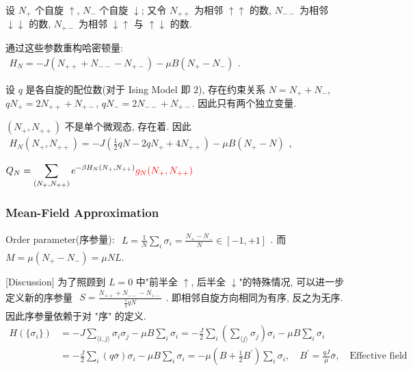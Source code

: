 \documentclass[../../main.tex]{subfiles}
\begin{document}
设 $N_{+}$ 个自旋 $\uparrow$, $N_{-}$ 个自旋 $\downarrow$; 又令 $N_{++}$ 为相邻 $\uparrow\uparrow$ 的数, $N_{--}$ 为相邻 $\downarrow\downarrow$ 的数, $N_{+-}$ 为相邻 $\downarrow\uparrow$ 与 $\uparrow\downarrow$ 的数. 

通过这些参数重构哈密顿量: $\begin{aligned}
    H_{N} = -J(N_{++}+N_{--}-N_{+-}) - \mu B(N_{+}-N_{-})
\end{aligned}$. 

设 $q$ 是各自旋的配位数(对于 Ising Model 即 $2$), 存在约束关系 $N = N_{+} + N_{-}$,  $qN_{+} = 2N_{++} + N_{+-}$,  $qN_{-} = 2N_{--} + N_{+-}$. 因此只有两个独立变量. 

$(N_{+},N_{++})$ 不是单个微观态, 存在着{\color{red}{简并}}. 因此$\begin{aligned}
    H_{N}(N_{+},N_{++}) = -J\left(\frac{1}{2}qN - 2qN_{+} + 4N_{++}\right) - \mu B(N_{+}-N)\end{aligned}$, 
    
$\begin{aligned}
        Q_{N} = \sum_{(N_{+},N_{++})} e^{-\beta H_{N}(N_{+},N_{++})}{\color{red}{g_{N}(N_{+},N_{++})}}
    \end{aligned}$ 

\subsubsection{Mean-Field Approximation}

Order parameter(序参量): $\begin{aligned}
    L = \frac{1}{N}\sum_{i}\sigma_{i} = \frac{N_{+}-N_{-}}{N}\in[-1,+1]
\end{aligned}$. 而 $M = \mu(N_{+}-N_{-}) = \mu NL$.

[Discussion] 为了照顾到 $L = 0$ 中"前半全 $\uparrow$, 后半全 $\downarrow$"的特殊情况, 可以进一步定义新的序参量 $\begin{aligned}
    S = \frac{N_{++}+N_{--}-N_{+-}}{\frac{1}{2}qN}
\end{aligned}$. 即相邻自旋方向相同为有序, 反之为无序. 因此序参量依赖于对 "序" 的定义.
\begin{align*}
    H(\{\sigma_{i}\}) 
    &= -J\sum_{\langle i,j\rangle}\sigma_{i}\sigma_{j} -\mu B\sum_{i}\sigma_{i} 
    = -\frac{J}{2}\sum_{i}\left(\sum_{\langle j\rangle}\sigma_{j}\right)\sigma_{i} - \mu B\sum_{i}\sigma_{i}\\
    &= -\frac{J}{2}\sum_{i}(q\overline{\sigma})\sigma_{i} - \mu B\sum_{i}\sigma_{i} 
    = -\mu\left(B+\frac{1}{2}B^{\prime}\right)\sum_{i}\sigma_{i},\quad B^{\prime} 
    = \frac{qJ}{\mu}\overline{\sigma},\quad\text{Effective field}
\end{align*}
\end{document}
